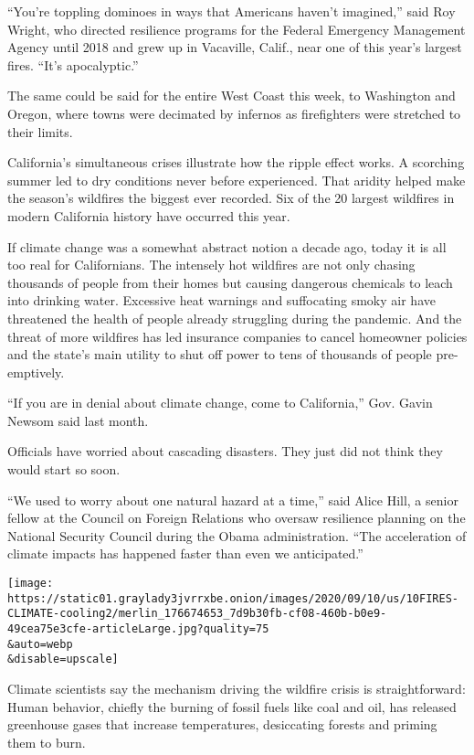 ``You're toppling dominoes in ways that Americans haven't imagined,''
said Roy Wright, who directed resilience programs for the Federal
Emergency Management Agency until 2018 and grew up in Vacaville, Calif.,
near one of this year's largest fires. ``It's apocalyptic.''

The same could be said for the entire West Coast this week, to
Washington and Oregon, where towns were decimated by infernos as
firefighters were stretched to their limits.

California's simultaneous crises illustrate how the ripple effect works.
A scorching summer led to dry conditions never before experienced. That
aridity helped make the season's wildfires the biggest ever recorded.
Six of the 20 largest wildfires in modern California history have
occurred this year.

If climate change was a somewhat abstract notion a decade ago, today it
is all too real for Californians. The intensely hot wildfires are not
only chasing thousands of people from their homes but causing dangerous
chemicals to leach into drinking water. Excessive heat warnings and
suffocating smoky air have threatened the health of people already
struggling during the pandemic. And the threat of more wildfires has led
insurance companies to cancel homeowner policies and the state's main
utility to shut off power to tens of thousands of people pre-emptively.

``If you are in denial about climate change, come to California,'' Gov.
Gavin Newsom said last month.

Officials have worried about cascading disasters. They just did not
think they would start so soon.

``We used to worry about one natural hazard at a time,'' said Alice
Hill, a senior fellow at the Council on Foreign Relations who oversaw
resilience planning on the National Security Council during the Obama
administration. ``The acceleration of climate impacts has happened
faster than even we anticipated.''

\texttt{[image: https://static01.graylady3jvrrxbe.onion/images/2020/09/10/us/10FIRES-CLIMATE-cooling2/merlin\_176674653\_7d9b30fb-cf08-460b-b0e9-49cea75e3cfe-articleLarge.jpg?quality=75\\\&auto=webp\\\&disable=upscale]}

Climate scientists say the mechanism driving the wildfire crisis is
straightforward: Human behavior, chiefly the burning of fossil fuels
like coal and oil, has released greenhouse gases that increase
temperatures, desiccating forests and priming them to burn.

